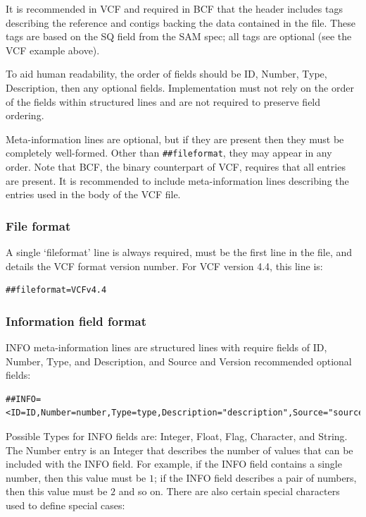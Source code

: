 \documentclass[8pt]{article}
\begin{document}
It is recommended in VCF and required in BCF that the header includes tags describing the reference and contigs backing the data contained in the file.
These tags are based on the SQ field from the SAM spec; all tags are optional (see the VCF example above).

To aid human readability, the order of fields should be ID, Number, Type, Description, then any optional fields.
Implementation must not rely on the order of the fields within structured lines and are not required to preserve field ordering.

Meta-information lines are optional, but if they are present then they must be completely well-formed.
Other than \verb|##fileformat|, they may appear in any order.
Note that BCF, the binary counterpart of VCF, requires that all entries are present.
It is recommended to include meta-information lines describing the entries used in the body of the VCF file.


\subsubsection{File format}
A single `fileformat' line is always required, must be the first line in the file, and details the VCF format version number.
For VCF version 4.4, this line is:

\begin{verbatim}
##fileformat=VCFv4.4
\end{verbatim}


\subsubsection{Information field format}
INFO meta-information lines are structured lines with require fields of ID, Number, Type, and Description, and Source and Version recommended optional fields:

\begin{verbatim}
##INFO=<ID=ID,Number=number,Type=type,Description="description",Source="source",Version="version">
\end{verbatim}

Possible Types for INFO fields are: Integer, Float, Flag, Character, and String.
The Number entry is an Integer that describes the number of values that can be included with the INFO field.
For example, if the INFO field contains a single number, then this value must be $1$; if the INFO field describes a pair of numbers, then this value must be $2$ and so on.
There are also certain special characters used to define special cases:
\end{document}
